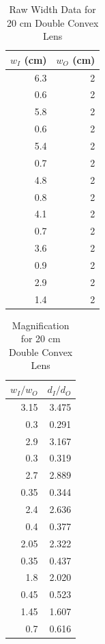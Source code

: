 \begin{table}[ht]
    \centering
    \begin{tabular}{|r|r|}
        \hline
        $w_{I}$ (cm) & $w_{O}$ (cm) \\
        \hline
        6.3 & 2 \\
        0.6 & 2 \\
        5.8 & 2 \\
        0.6 & 2 \\
        5.4 & 2 \\
        0.7 & 2 \\
        4.8 & 2 \\
        0.8 & 2 \\
        4.1 & 2 \\
        0.7 & 2 \\
        3.6 & 2 \\
        0.9 & 2 \\
        2.9 & 2 \\
        1.4 & 2 \\
        \hline
    \end{tabular}
    \caption{Raw Width Data for 20 cm Double Convex Lens}
    \label{table.08.width.20cm}
\end{table}
%
\begin{table}[ht]
    \centering
    \begin{tabular}{|r|r|}
        \hline
        $w_{I} / w_{O}$ & $d_{I} / d_{O}$ \\
        \hline
        3.15 & 3.475 \\
        0.3 & 0.291 \\
        2.9 & 3.167 \\
        0.3 & 0.319 \\
        2.7 & 2.889 \\
        0.35 & 0.344 \\
        2.4 & 2.636 \\
        0.4 & 0.377 \\
        2.05 & 2.322 \\
        0.35 & 0.437 \\
        1.8 & 2.020 \\
        0.45 & 0.523 \\
        1.45 & 1.607 \\
        0.7 & 0.616 \\
        \hline
    \end{tabular}
    \caption{Magnification for 20 cm Double Convex Lens}
    \label{table.08.magnification.20cm}
\end{table}
